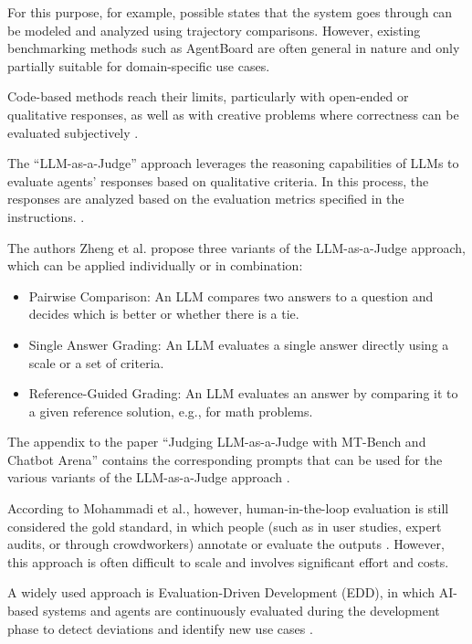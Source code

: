 For this purpose, for example, possible states that the system goes through can be modeled and analyzed using
trajectory comparisons. However, existing benchmarking methods such as AgentBoard
\cite{maAgentBoardAnalyticalEvaluation2024} are often
general in nature and only partially suitable for domain-specific use cases.

Code-based methods reach their limits, particularly with open-ended or qualitative responses, as well as with
creative problems where correctness
can be evaluated subjectively
\cite[p.~7]{mohammadiEvaluationBenchmarkingLLM2025}.

\label{sec:llm-as-a-judge}
The “LLM-as-a-Judge” approach leverages the reasoning capabilities of LLMs to evaluate agents' responses based on
qualitative criteria. In this process, the responses are analyzed based on
the evaluation metrics specified in the instructions. \cite[p.~7]{mohammadiEvaluationBenchmarkingLLM2025}.

The authors Zheng et al. \cite[p. 4]{zhengJudgingLLMasaJudgeMTBench2023} propose three variants of the
LLM-as-a-Judge approach, which can be applied individually or in combination:
\begin{itemize}
  \item Pairwise Comparison: An LLM compares two answers to a question and decides which is better or whether
    there is a tie.
  \item Single Answer Grading: An LLM evaluates a single answer directly using a scale or a set of criteria.
  \item Reference-Guided Grading: An LLM evaluates an answer by comparing it to a given
    reference solution, e.g., for math problems.
\end{itemize}

The appendix to the paper “Judging LLM-as-a-Judge with MT-Bench and Chatbot Arena” contains the corresponding
prompts that can be used for the various variants of the LLM-as-a-Judge approach
\cite{zhengJudgingLLMasaJudgeMTBench2023}.

According to Mohammadi et al., however, human-in-the-loop evaluation is still considered the gold standard, in which
people (such as in user studies, expert audits, or through crowdworkers) annotate or
evaluate the outputs \cite[p.~7]{mohammadiEvaluationBenchmarkingLLM2025}. However, this approach is often
difficult to scale and involves significant effort and costs.

A widely used approach is Evaluation-Driven Development (EDD), in which AI-based systems and agents
are continuously evaluated during the development phase to detect deviations and identify new use cases
\cite[p.~6]{mohammadiEvaluationBenchmarkingLLM2025}.